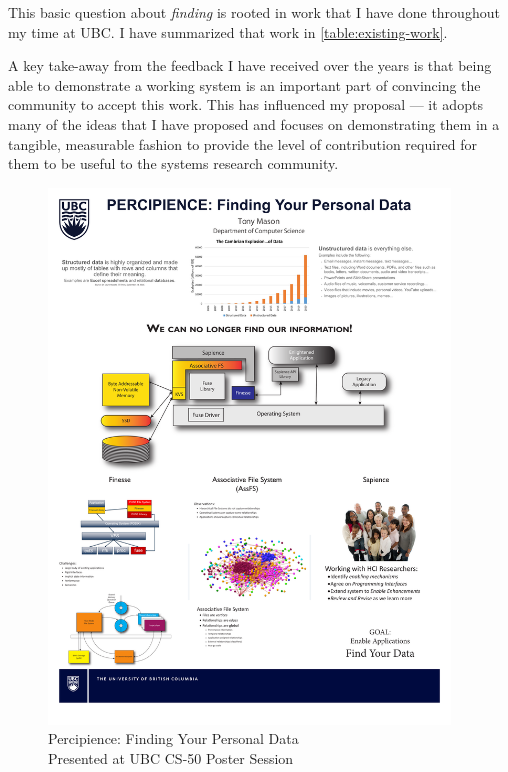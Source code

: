 This basic question about \emph{finding} is rooted in work that I have done
throughout my time at UBC.  I have summarized that work in
\autoref{table:existing-work}.

A key take-away from the feedback I have received over the years is that being
able to demonstrate a working system is an important part of convincing the
community to accept this work.  This has influenced my proposal --- it adopts
many of the ideas that I have proposed and focuses on demonstrating them in a
tangible, measurable fashion to provide the level of contribution required for
them to be useful to the systems research community.

\begin{figure}[!htb]
    \centering
    \caption{Percipience: Finding Your Personal Data \\Presented at UBC CS-50 Poster Session}
    \label{figure:percipience-poster}
    \includegraphics[width=0.95\textwidth]{figures/sapience-poster.pdf}
\end{figure}

